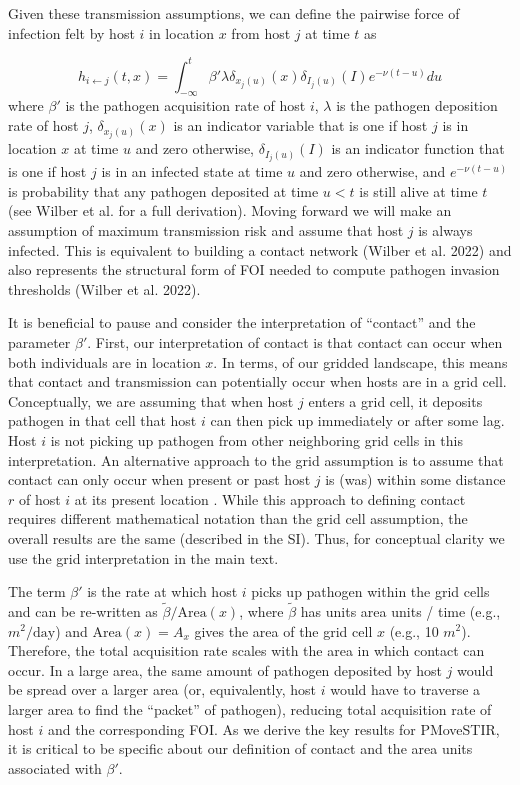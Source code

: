 \documentclass[letterpaper]{article}
\begin{document}
Given these transmission assumptions, we can define the pairwise force of infection felt by host $i$ in location $x$ from host $j$ at time $t$ as \citep{Wilber2022}

\begin{equation}
    h_{i \leftarrow j}(t, x) = \int_{-\infty}^{t} \beta' \lambda \delta_{x_j(u)}(x) \delta_{I_j(u)}(I) e^{-\nu(t - u)} du
    \label{eq:original_foi}
\end{equation}
where $\beta'$ is the pathogen acquisition rate of host $i$, $\lambda$ is the pathogen deposition rate of host $j$, $\delta_{x_j(u)}(x)$ is an indicator variable that is one if host $j$ is in location $x$ at time $u$ and zero otherwise, $\delta_{I_j(u)}(I)$ is an indicator function that is one if host $j$ is in an infected state at time $u$ and zero otherwise, and $e^{-\nu(t - u)}$ is probability that any pathogen deposited at time $u < t$ is still alive at time $t$ (see Wilber et al.\citeyear{Wilber2022} for a full derivation).  Moving forward we will make an assumption of maximum transmission risk and assume that host $j$ is always infected. This is equivalent to building a contact network (Wilber et al. 2022) and also represents the structural form of FOI needed to compute pathogen invasion thresholds (Wilber et al. 2022). 

It is beneficial to pause and consider the interpretation of ``contact'' and the parameter $\beta'$.  First, our interpretation of contact is that contact can occur when both individuals are in location $x$.  In terms, of our gridded landscape, this means that contact and transmission can potentially occur when hosts are in a grid cell.  Conceptually, we are assuming that when host $j$ enters a grid cell, it deposits pathogen in that cell that host $i$ can then pick up immediately or after some lag. Host $i$ is not picking up pathogen from other neighboring grid cells in this interpretation.  An alternative approach to the grid assumption is to assume that contact can only occur when present or past host $j$ is (was) within some distance $r$ of host $i$ at its present location \citep[i.e., a top hat assumption][]{Ovaskainen,Wilber2022}. While this approach to defining contact requires different mathematical notation than the grid cell assumption, the overall results are the same (described in the SI). Thus, for conceptual clarity we use the grid interpretation in the main text.

The term $\beta'$ is the rate at which host $i$ picks up pathogen within the grid cells and can be re-written as $\tilde{\beta} / \text{Area}(x)$, where $\tilde{\beta}$ has units area units / time (e.g., $m^2 / \text{day}$) and $\text{Area}(x) = A_x$ gives the area of the grid cell $x$ (e.g., 10 $m^2$). Therefore, the total acquisition rate scales with the area in which contact can occur. In a large area, the same amount of pathogen deposited by host $j$ would be spread over a larger area (or, equivalently, host $i$ would have to traverse a larger area to find the ``packet'' of pathogen), reducing total acquisition rate of host $i$ and the corresponding FOI.  As we derive the key results for PMoveSTIR, it is critical to be specific about our definition of contact and the area units associated with $\beta'$.  
\end{document}
